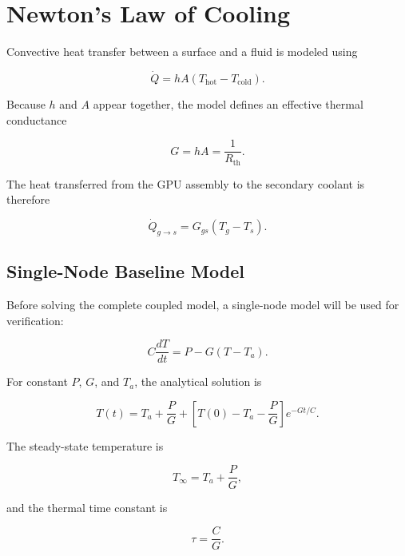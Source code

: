 \documentclass[11pt]{article}
\begin{document}
\section{Newton's Law of Cooling}

Convective heat transfer between a surface and a fluid is modeled using

\begin{equation}
\dot Q=hA(T_{\mathrm{hot}}-T_{\mathrm{cold}}).
\end{equation}

Because \(h\) and \(A\) appear together, the model defines an effective thermal
conductance

\begin{equation}
G=hA=\frac{1}{R_{\mathrm{th}}}.
\end{equation}

The heat transferred from the GPU assembly to the secondary coolant is therefore

\begin{equation}
\dot Q_{g\rightarrow s}=G_{gs}(T_g-T_s).
\end{equation}

\subsection{Single-Node Baseline Model}

Before solving the complete coupled model, a single-node model will be used for
verification:

\begin{equation}
C\frac{dT}{dt}=P-G(T-T_a).
\label{eq:one-node}
\end{equation}

For constant \(P\), \(G\), and \(T_a\), the analytical solution is

\begin{equation}
T(t)=T_a+\frac{P}{G}
+\left[T(0)-T_a-\frac{P}{G}\right]
e^{-Gt/C}.
\label{eq:analytical}
\end{equation}

The steady-state temperature is

\begin{equation}
T_{\infty}=T_a+\frac{P}{G},
\end{equation}

and the thermal time constant is

\begin{equation}
\tau=\frac{C}{G}.
\end{equation}
\end{document}
